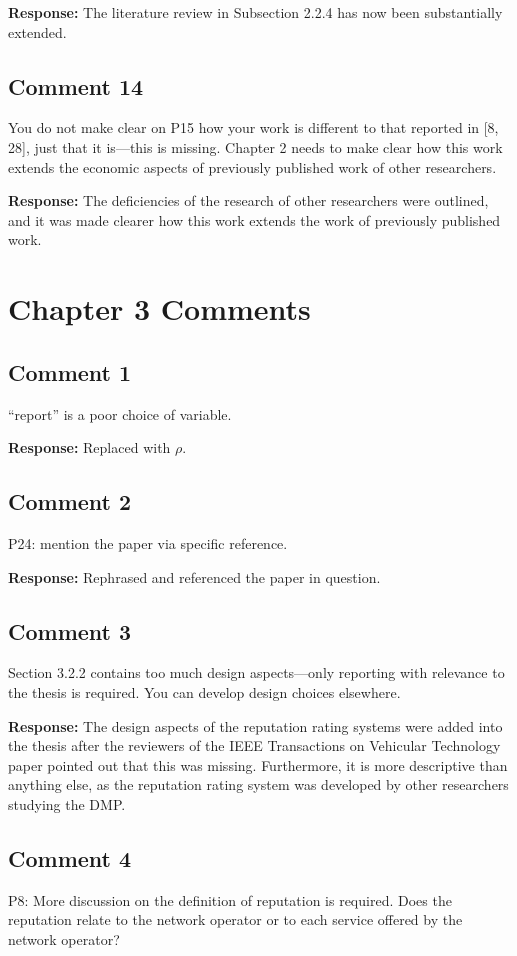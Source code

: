 \documentclass[10pt,a4paper,notitlepage]{article}
\numberwithin{equation}{section}
\begin{document}
\textbf{Response:}
The literature review in Subsection 2.2.4 has now been substantially extended.

\subsection{Comment 14}
You do not make clear on P15 how your work is different to that reported in [8, 28], just that it is---this is missing. Chapter 2 needs to make clear how this work extends the economic aspects of previously published work of other researchers.

\textbf{Response:}
The deficiencies of the research of other researchers were outlined, and it was made clearer how this work extends the work of previously published work.

\clearpage

\section{Chapter 3 Comments}
\subsection{Comment 1}
``report'' is a poor choice of variable.

\textbf{Response:}
Replaced with $\rho$.

\subsection{Comment 2}
P24: mention the paper via specific reference.

\textbf{Response:}
Rephrased and referenced the paper in question.

\subsection{Comment 3}
Section 3.2.2 contains too much design aspects---only reporting with relevance to the thesis is required. You can develop design choices elsewhere.

\textbf{Response:}
The design aspects of the reputation rating systems were added into the thesis after the reviewers of the IEEE Transactions on Vehicular Technology paper pointed out that this was missing. Furthermore, it is more descriptive than anything else, as the reputation rating system was developed by other researchers studying the DMP.

\subsection{Comment 4}
P8: More discussion on the definition of reputation is required. Does the reputation relate to the network operator or to each service offered by the network operator?
\end{document}
